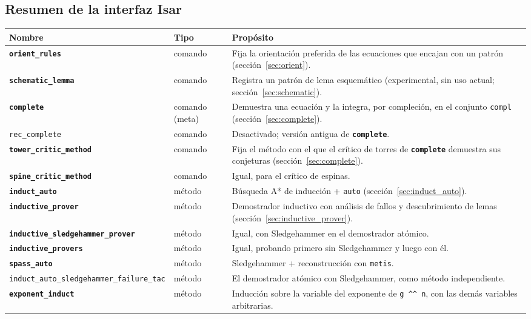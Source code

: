 \documentclass[11pt,a4paper]{article}
\newcommand{\isa}[1]{\texttt{#1}}
\newcommand{\cmd}[1]{\textbf{\texttt{#1}}}
\theoremstyle{definition}
\theoremstyle{remark}
\begin{document}
\subsection{Resumen de la interfaz Isar}

\begin{longtable}{@{}p{5.6cm}>{\raggedright\arraybackslash}p{2.2cm}>{\raggedright\arraybackslash}p{6.6cm}@{}}
\toprule
\textbf{Nombre} & \textbf{Tipo} & \textbf{Propósito}\\
\midrule
\endhead
\cmd{orient\_rules} & comando & Fija la orientación preferida de las ecuaciones que
  encajan con un patrón (sección~\ref{sec:orient}).\\
\cmd{schematic\_lemma} & comando & Registra un patrón de lema esquemático
  (experimental, sin uso actual; sección~\ref{sec:schematic}).\\
\cmd{complete} & comando (meta) & Demuestra una ecuación y la integra, por compleción,
  en el conjunto \isa{compl} (sección~\ref{sec:complete}).\\
\isa{rec\_complete} & comando & Desactivado; versión antigua de \cmd{complete}.\\
\cmd{tower\_critic\_method} & comando & Fija el método con el que el crítico de
  torres de \cmd{complete} demuestra sus conjeturas (sección~\ref{sec:complete}).\\
\cmd{spine\_critic\_method} & comando & Igual, para el crítico de espinas.\\
\midrule
\cmd{induct\_auto} & método & Búsqueda A* de inducción + \isa{auto}
  (sección~\ref{sec:induct_auto}).\\
\cmd{inductive\_prover} & método & Demostrador inductivo con análisis de fallos y
  descubrimiento de lemas (sección~\ref{sec:inductive_prover}).\\
\cmd{inductive\_sledgehammer\_prover} & método & Igual, con Sledgehammer en el
  demostrador atómico.\\
\cmd{inductive\_provers} & método & Igual, probando primero sin Sledgehammer y luego con él.\\
\cmd{spass\_auto} & método & Sledgehammer + reconstrucción con \isa{metis}.\\
\isa{induct\_auto\_sledgehammer\_\-failure\_tac} & método & El demostrador atómico con
  Sledgehammer, como método independiente.\\
\cmd{exponent\_induct} & método & Inducción sobre la variable del exponente de
  \isa{g \textasciicircum\textasciicircum\ n}, con las demás variables arbitrarias.\\

\end{longtable}
\end{document}
